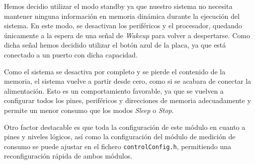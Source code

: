 Hemos decidio utilizar el modo standby ya que nuestro sistema no necesita mantener ninguna información en memoria dinámica durante la ejecución del sistema. En este modo, se desactivan los periféricos y el procesador, quedando únicamente a la espera de una señal de \textit{Wakeup} para volver a despertarse. Como dicha señal hemos decidido utilizar el botón azul de la placa, ya que está conectado a un puerto con dicha capacidad.

Como el sistema se desactiva por completo y se pierde el contenido de la memoria, el sistema vuelve a partir desde cero, como si se acabara de conectar la alimentación. Esto es un comportamiento favorable, ya que se vuelven a configurar todos los pines, periféricos y direcciones de memoria adecuadamente y permite un menor consumo que los modos \textit{Sleep} o \textit{Stop}.

Otro factor destacable es que toda la configuración de este módulo en cuanto a pines y niveles lógicos, así como la configuración del módulo de medición de consumo se puede ajustar en el fichero \texttt{controlConfig.h}, permitiendo una reconfiguración rápida de ambos módulos.
